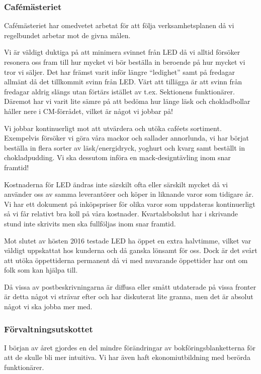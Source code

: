 \documentclass[../_main/handlingar.tex]{subfiles}
\begin{document}
\subsubsection*{Cafémästeriet}
Cafémästeriet har omedvetet arbetat för att följa verksamhetsplanen då vi regelbundet arbetar mot de givna målen.

Vi är väldigt duktiga på att minimera svinnet från LED då vi alltid försöker resonera oss fram till hur mycket vi bör beställa in beroende på hur mycket vi tror vi säljer. Det har främst varit inför längre “ledighet” samt på fredagar allmänt då det tillkommit svinn från LED. Värt att tillägga är att svinn från fredagar aldrig slängs utan förtärs istället av t.ex. Sektionens funktionärer. Däremot har vi varit lite sämre på att bedöma hur länge läsk och chokladbollar håller nere i CM-förrådet, vilket är något vi jobbar på!

Vi jobbar kontinuerligt mot att utvärdera och utöka caféets sortiment. Exempelvis försöker vi göra våra mackor och sallader annorlunda, vi har börjat beställa in flera sorter av läsk/energidryck, yoghurt och kvarg samt beställt in chokladpudding. Vi ska dessutom införa en mack-designtävling inom snar framtid!

Kostnaderna för LED ändras inte särskilt ofta eller särskilt mycket då vi använder oss av samma leverantörer och köper in liknande varor som tidigare år. Vi har ett dokument på inköpspriser för olika varor som uppdateras kontinuerligt så vi får relativt bra koll på våra kostnader. Kvartalsbokslut har i skrivande stund inte skrivits men ska fullföljas inom snar framtid.

Mot slutet av hösten 2016 testade LED ha öppet en extra halvtimme, vilket var väldigt uppskattat hos kunderna och då ganska lönsamt för oss. Dock är det svårt att utöka öppettiderna permanent då vi med nuvarande öppettider har ont om folk som kan hjälpa till.

Då vissa av postbeskrivningarna är diffusa eller smått utdaterade på vissa fronter är detta något vi strävar efter och har diskuterat lite granna, men det är absolut något vi ska jobba mer med.

\subsubsection*{Förvaltningsutskottet}
I början av året gjordes en del mindre förändringar av bokföringsblanketterna för att de skulle bli mer intuitiva. Vi har även haft ekonomiutbildning med berörda funktionärer.
\end{document}
